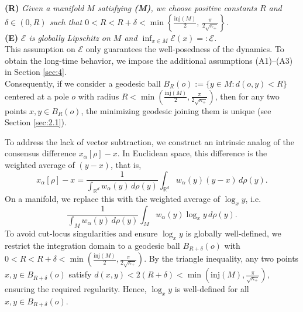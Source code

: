 \documentclass[11pt]{amsart}
\newcommand{\bbr}{\mathbb R}
\newcommand{\p}{o}%
\newcommand{\dist}{d}%
\newcommand{\inj}{\mathrm{inj}}%
\begin{document}
\noindent\textbf{(R)} \textit{Given a manifold $M$ satisfying \textbf{(M)}, we choose positive constants $R$ and $\delta \in (0,R)$ such that $0<R<R+\delta<\min\left\{\frac{\inj(M)}{2},\,\frac{\pi}{2\sqrt{\kappa_+}}\right\}$.}\\


\noindent\textbf{(E)} \textit{$\mathcal{E}$ is globally Lipschitz on $M$ and $\inf_{x\in M} \mathcal E(x) =:\underline{\mathcal E}$.}\\

This assumption on $\mathcal{E}$ only guarantees the well-posedness of the dynamics. To obtain the long-time behavior, we  impose the additional assumptions (A1)--(A3) in Section \ref{sec:4}.\\



Consequently, if we consider a geodesic ball $B_R(\p):=\{y\in M:\dist(\p,y)<R\}$ centered at a pole $\p$ with radius $R<\min\left(\frac{\mathrm{inj}(M)}{2}, \frac{\pi}{2\sqrt{\kappa_+}}\right)$, then for any two points $x,y\in B_R(\p)$, the minimizing geodesic joining them is unique (see Section \ref{sec:2.1}).


To address the lack of vector subtraction, we construct an intrinsic analog of the consensus difference $x_\alpha[\rho]-x$. In Euclidean space, this difference is the weighted average of $(y-x)$, that is, 
\[
x_\alpha[\rho]-x
=
\frac{1}{\int_{\bbr^d} w_\alpha(y)\, d\rho(y)}
\int_{\bbr^d} w_\alpha(y)(y-x)\, d\rho(y).
\]
 On a manifold, we replace this with the weighted average of $\log_x y$, i.e.
 \[
\frac{1}{\int_M w_\alpha(y)\, d\rho(y)}
\int_M w_\alpha(y)\log_x y\, d\rho(y).
\]
To avoid cut-locus singularities and ensure $\log_x y$ is globally well-defined, we restrict the integration domain to a geodesic ball $B_{R+\delta}(\p)$ with $0<R<R+\delta<\min\left(\frac{\mathrm{inj}(M)}{2}, \frac{\pi}{2\sqrt{\kappa_+}}\right)$. By the triangle inequality, any two points $x,y\in B_{R+\delta}(\p)$ satisfy $\dist(x,y) < 2(R+\delta) <\min\left(\mathrm{inj}(M), \frac{\pi}{\sqrt{\kappa_+}}\right)$, ensuring the required regularity. Hence, $\log_x y$ is well-defined for all $x,y\in B_{R+\delta}(\p)$.
\end{document}
